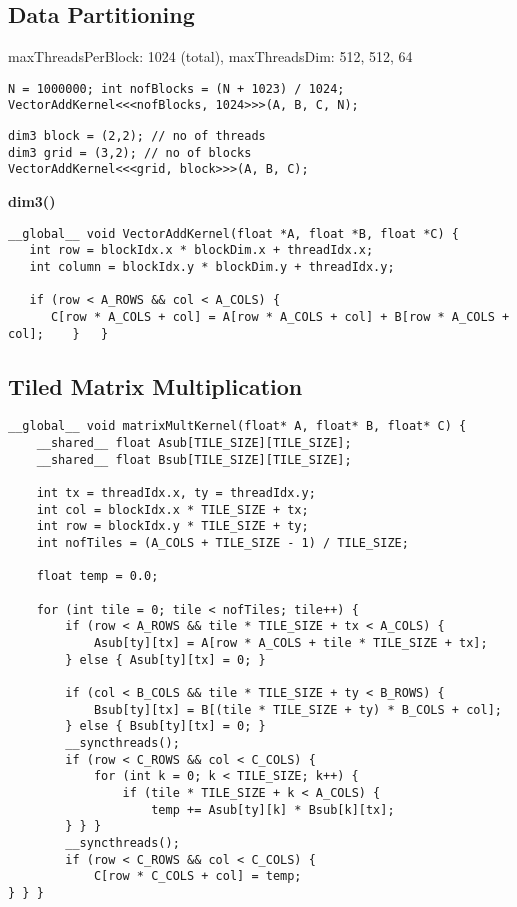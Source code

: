 \subsection{Data Partitioning}
maxThreadsPerBlock: 1024 (total), maxThreadsDim: 512, 512, 64
\begin{lstlisting}[style=csharp]
N = 1000000; int nofBlocks = (N + 1023) / 1024;
VectorAddKernel<<<nofBlocks, 1024>>>(A, B, C, N);
\end{lstlisting}
\vspace{1mm}
\begin{lstlisting}[style=csharp]
dim3 block = (2,2); // no of threads
dim3 grid = (3,2); // no of blocks
VectorAddKernel<<<grid, block>>>(A, B, C);
\end{lstlisting}
\textbf{dim3()}
\begin{lstlisting}[style=csharp]
 __global__ void VectorAddKernel(float *A, float *B, float *C) {
   int row = blockIdx.x * blockDim.x + threadIdx.x;
   int column = blockIdx.y * blockDim.y + threadIdx.y;
   
   if (row < A_ROWS && col < A_COLS) {
      C[row * A_COLS + col] = A[row * A_COLS + col] + B[row * A_COLS + col]; 	}	}
\end{lstlisting}
\subsection{Tiled Matrix Multiplication}
\begin{lstlisting}[style=csharp]
__global__ void matrixMultKernel(float* A, float* B, float* C) {
	__shared__ float Asub[TILE_SIZE][TILE_SIZE];
	__shared__ float Bsub[TILE_SIZE][TILE_SIZE];

	int tx = threadIdx.x, ty = threadIdx.y;
	int col = blockIdx.x * TILE_SIZE + tx;
	int row = blockIdx.y * TILE_SIZE + ty;
	int nofTiles = (A_COLS + TILE_SIZE - 1) / TILE_SIZE;

	float temp = 0.0;

	for (int tile = 0; tile < nofTiles; tile++) {
		if (row < A_ROWS && tile * TILE_SIZE + tx < A_COLS) {
			Asub[ty][tx] = A[row * A_COLS + tile * TILE_SIZE + tx];
		} else { Asub[ty][tx] = 0; }

		if (col < B_COLS && tile * TILE_SIZE + ty < B_ROWS) {
			Bsub[ty][tx] = B[(tile * TILE_SIZE + ty) * B_COLS + col];
		} else { Bsub[ty][tx] = 0; }
		__syncthreads();
		if (row < C_ROWS && col < C_COLS) {
			for (int k = 0; k < TILE_SIZE; k++) {
				if (tile * TILE_SIZE + k < A_COLS) {
					temp += Asub[ty][k] * Bsub[k][tx];
		} } }
		__syncthreads();
		if (row < C_ROWS && col < C_COLS) {
			C[row * C_COLS + col] = temp;
} } }
\end{lstlisting}